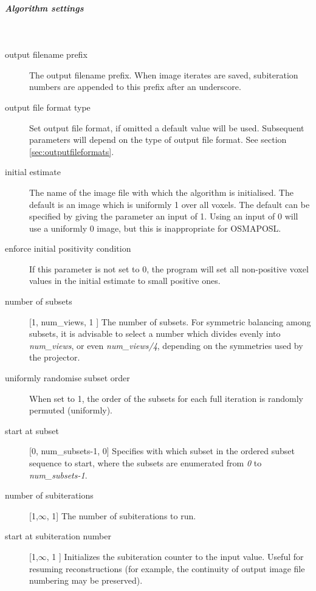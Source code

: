 \documentclass{article}
\newcommand{\subsubsubsubsection}[1]{\subparagraph{#1} \mbox{} \\}
\begin{document}
{ \subsubsubsubsection{Algorithm settings}
}
\label{sec:IterativeReconSettings}
\begin{description}

\item[output filename prefix]
 The output filename prefix. When image iterates are saved, subiteration 
numbers are appended to this prefix after an underscore.

\item[output file format type]
Set output file format, if omitted a default value will be used. 
Subsequent parameters will depend on the type of output file 
format. See section \ref{sec:outputfileformats}.


\item[initial estimate]
The name of the image file with which the algorithm is initialised. 
The default is an image which is uniformly 1 over all voxels. 
The default can be specified by giving the parameter an input 
of 1. Using an input of 0 will use a uniformly 0 image, but this 
is inappropriate for OSMAPOSL.


\item[enforce initial positivity condition]
If this parameter is not set to 0, the program will set all non-positive 
voxel values in the initial estimate to small positive ones.


\item[number of subsets] [1, num\_views, 1 {]}
The number of subsets. For symmetric balancing among subsets, 
it is advisable to select a number which divides evenly into \textit{num\_views},
or even \textit{num\_views/4}, depending on the symmetries used by the projector.


\item[uniformly randomise subset order]
When set to 1, the order of the subsets for each full iteration 
is randomly permuted (uniformly).


\item[start at subset] [0, num\_subsets-1, 0{]}
Specifies with which subset in the ordered subset sequence to 
start, where the subsets are enumerated from \textit{0} to \textit{num\_subsets-1}. 

\item[number of subiterations] [1,\ensuremath{\infty}, 1{]}
The number of subiterations to run.


\item[start at subiteration number] [1,\ensuremath{\infty}, 1 {]}
Initializes the subiteration counter to the input value. Useful 
for resuming reconstructions (for example, the continuity of 
output image file numbering may be preserved).



\end{description}
\end{document}
